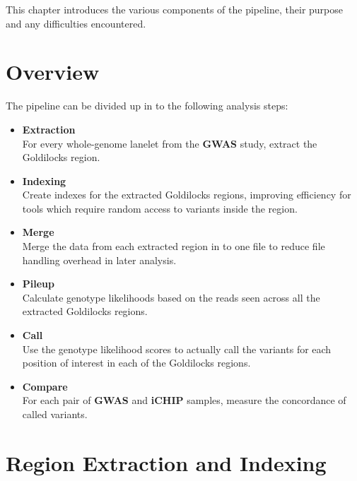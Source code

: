 This chapter introduces the various components of the pipeline, their purpose
and any difficulties encountered.

\section{Overview}


The pipeline can be divided up in to the following analysis steps:

\begin{itemize}
    \item \textbf{Extraction} \hfill\\
        For every whole-genome lanelet from the \textbf{GWAS} study, extract the
        Goldilocks region.
    \item \textbf{Indexing} \hfill\\
        Create indexes for the extracted Goldilocks regions, improving
        efficiency for tools which require random access to variants inside the
        region.
    \item \textbf{Merge} \hfill\\
        Merge the data from each extracted region in to one file to reduce file
        handling overhead in later analysis.
    \item \textbf{Pileup} \hfill\\
        Calculate genotype likelihoods based on the reads seen across all the
        extracted Goldilocks regions.
    \item \textbf{Call} \hfill\\
        Use the genotype likelihood scores to actually call the variants for
        each position of interest in each of the Goldilocks regions.
    \item \textbf{Compare} \hfill\\
        For each pair of \textbf{GWAS} and \textbf{iCHIP} samples, measure the
        concordance of called variants.
\end{itemize}

\section{Region Extraction and Indexing}
